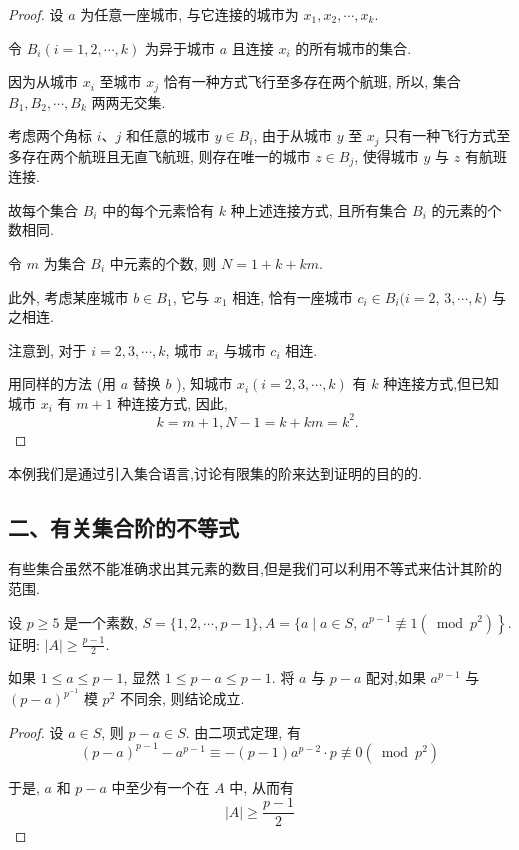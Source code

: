 \begin{proof}
	设 $a$ 为任意一座城市, 与它连接的城市为 $x_{1}, x_{2}, \cdots, x_{k}$.

	令 $B_{i}(i=1,2, \cdots, k)$ 为异于城市 $a$ 且连接 $x_{i}$ 的所有城市的集合.

	因为从城市 $x_{i}$ 至城市 $x_{j}$ 恰有一种方式飞行至多存在两个航班, 所以, 集合 $B_{1}, B_{2}, \cdots, B_{k}$ 两两无交集.

	考虑两个角标 $i 、 j$ 和任意的城市 $y \in B_{i}$, 由于从城市 $y$ 至 $x_{j}$ 只有一种飞行方式至多存在两个航班且无直飞航班, 则存在唯一的城市 $z \in B_{j}$, 使得城市 $y$ 与 $z$ 有航班连接.

	故每个集合 $B_{i}$ 中的每个元素恰有 $k$ 种上述连接方式, 且所有集合 $B_{i}$ 的元素的个数相同.

	令 $m$ 为集合 $B_{i}$ 中元素的个数, 则 $N=1+k+k m$.

	此外, 考虑某座城市 $b \in B_{1}$, 它与 $x_{1}$ 相连, 恰有一座城市 $c_{i} \in B_{i}(i=2$, $3, \cdots, k)$ 与之相连.

	注意到, 对于 $i=2,3, \cdots, k$, 城市 $x_{i}$ 与城市 $c_{i}$ 相连.

	用同样的方法 (用 $a$ 替换 $b$ ), 知城市 $x_{i}(i=2,3, \cdots, k)$ 有 $k$ 种连接方式,但已知城市 $x_{i}$ 有 $m+1$ 种连接方式, 因此,
	$$
		k=m+1, N-1=k+k m=k^{2} \text {. }
	$$
\end{proof}

\begin{note}
	本例我们是通过引入集合语言,讨论有限集的阶来达到证明的目的的.
\end{note}

\subsection{二、有关集合阶的不等式}
有些集合虽然不能准确求出其元素的数目,但是我们可以利用不等式来估计其阶的范围.
\begin{example}
	设 $p \geqslant 5$ 是一个素数, $S=\{1,2, \cdots, p-1\}, A=\{a \mid a \in S$, $\left.a^{p-1} \not \equiv 1\left(\bmod p^{2}\right)\right\}$. 证明: $|A| \geqslant \frac{p-1}{2}$.
\end{example}

\begin{analysis}
	如果 $1 \leqslant a \leqslant p-1$, 显然 $1 \leqslant p-a \leqslant p-1$. 将 $a$ 与 $p-a$ 配对,如果 $a^{p-1}$ 与 $(p-a)^{p^{-1}}$ 模 $p^{2}$ 不同余, 则结论成立.
\end{analysis}

\begin{proof}
	设 $a \in S$, 则 $p-a \in S$. 由二项式定理, 有
	$$
		(p-a)^{p-1}-a^{p-1} \equiv-(p-1) a^{p-2} \cdot p \not \equiv 0\left(\bmod p^{2}\right)
	$$

	于是, $a$ 和 $p-a$ 中至少有一个在 $A$ 中, 从而有
	$$
		|A| \geqslant \frac{p-1}{2}
	$$
\end{proof}

